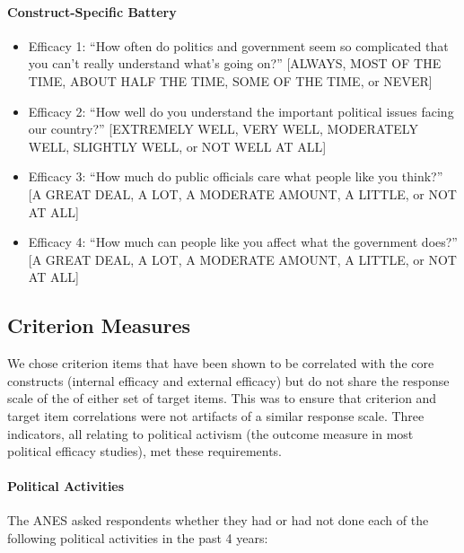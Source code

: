 \documentclass[man,apacite,floatsintext]{apa6}
\begin{document}
\paragraph{Construct-Specific Battery}
\begin{itemize}
\item Efficacy 1: ``How often do politics and government seem so complicated that you can't really understand what's going on?'' [ALWAYS, MOST OF THE TIME, ABOUT HALF THE TIME, SOME OF THE TIME, or NEVER] 
\item Efficacy 2: ``How well do you understand the important political issues facing our country?'' [EXTREMELY WELL, VERY WELL, MODERATELY WELL, SLIGHTLY WELL, or NOT WELL AT ALL]
\item Efficacy 3: ``How much do public officials care what people like you think?'' [A GREAT DEAL, A LOT, A MODERATE AMOUNT, A LITTLE, or NOT AT ALL]
\item Efficacy 4: ``How much can people like you affect what the government does?'' [A GREAT DEAL, A LOT, A MODERATE AMOUNT, A LITTLE, or NOT AT ALL]
\end{itemize}

\subsection{Criterion Measures} We chose criterion items that have been shown to be correlated with the core constructs (internal efficacy and external efficacy) but do not share the response scale of the of either set of target items. This was to ensure that criterion and target item correlations were not artifacts of a similar response scale. Three indicators, all relating to political activism (the outcome measure in most political efficacy studies), met these requirements. 

\paragraph{Political Activities}
The ANES asked respondents whether they had or had not done each of the following political activities in the past 4 years:
\end{document}
